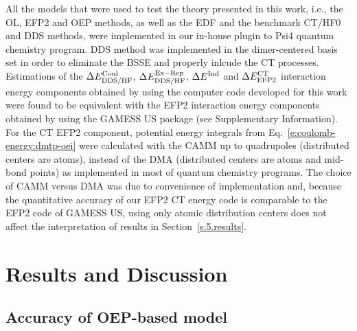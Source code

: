 \documentclass[aip,jcp,amsmath,amssymb,reprint,floatfix]{revtex4-1}
\begin{document}
All the models that were used to test the theory presented in this work,
i.e., the OL, EFP2 and OEP methods, as well as the EDF and the benchmark CT/HF0 and DDS methods,
were implemented in our in\hyp{}house plugin to {\sc Psi4} quantum chemistry program.\cite{Psi4.JCTC.2017}
DDS method was implemented in the dimer\hyp{}centered basis set\cite{Chalasinski.Gutowski.MolPhys.1985}
in order to eliminate the BSSE and properly inlcude the CT processes.\cite{Stone.Misquitta.CPL.2009}
Estimations of the $\Delta E^{\rm Coul}_{\rm DDS/HF}$, $\Delta E^{\rm Ex-Rep}_{\rm DDS/HF}$,
$\Delta E^{\rm Ind}$ and $\Delta E^{\rm CT}_{\rm EFP2}$ interaction energy components 
obtained by using the computer 
code developed for this work were
found to be equivalent with the EFP2 interaction energy components
obtained by using the {\sc GAMESS US} package\cite{GAMESS.JCC.1993} 
(see Supplementary Information).
For the CT EFP2 component,
potential energy integrals
from Eq.~\eqref{e:coulomb-energy:dmtp-oei} 
were calculated with the
CAMM up to quadrupoles
(distributed centers are atoms), 
instead of the DMA 
(distributed centers are atoms and mid\hyp{}bond points) 
as implemented in most
of quantum chemistry programs. The choice of CAMM versus DMA
was due to convenience of implementation and, because
the quantitative accuracy of our EFP2 CT energy code is comparable to
the EFP2 code of {\sc GAMESS US}, using only atomic distribution centers
does not affect the interpretation
of results in Section~\ref{s:5.results}.


\section{\label{s:5.results}Results and Discussion}

\subsection{\label{ss:5.1.accuracy}Accuracy of OEP-based model}
\end{document}
